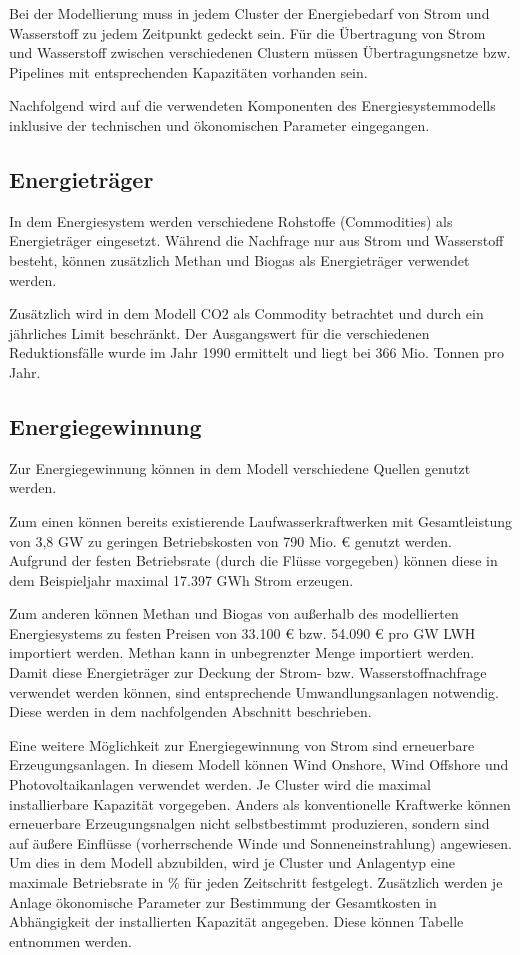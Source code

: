 Bei der Modellierung muss in jedem Cluster der Energiebedarf von Strom und Wasserstoff zu jedem Zeitpunkt gedeckt sein. Für die Übertragung von Strom und Wasserstoff zwischen verschiedenen Clustern müssen Übertragungsnetze bzw. Pipelines mit entsprechenden Kapazitäten vorhanden sein. 

Nachfolgend wird auf die verwendeten Komponenten des Energiesystemmodells inklusive der technischen und ökonomischen Parameter eingegangen. 
 
\subsection{Energieträger}
In dem Energiesystem werden verschiedene Rohstoffe (Commodities) als Energieträger eingesetzt. 
Während die Nachfrage nur aus Strom und Wasserstoff besteht, können zusätzlich Methan und Biogas als Energieträger verwendet werden.

Zusätzlich wird in dem Modell CO2 als Commodity betrachtet und durch ein jährliches Limit beschränkt. Der Ausgangswert für die verschiedenen Reduktionsfälle wurde im Jahr 1990 ermittelt und liegt bei 366 Mio. Tonnen pro Jahr. 

\subsection{Energiegewinnung}
Zur Energiegewinnung können in dem Modell verschiedene Quellen genutzt werden.

Zum einen können bereits existierende Laufwasserkraftwerken mit Gesamtleistung von 3,8 GW zu geringen Betriebskosten von 790 Mio. € genutzt werden. Aufgrund der festen Betriebsrate (durch die Flüsse vorgegeben) können diese in dem Beispieljahr maximal 17.397 GWh Strom erzeugen.

Zum anderen können Methan und Biogas von außerhalb des modellierten Energiesystems zu festen Preisen von 33.100 € bzw. 54.090 € pro GW LWH importiert werden. Methan kann in unbegrenzter Menge importiert werden.  
Damit diese Energieträger zur Deckung der Strom- bzw. Wasserstoffnachfrage verwendet werden können, sind entsprechende Umwandlungsanlagen notwendig. Diese werden in dem nachfolgenden Abschnitt beschrieben.

Eine weitere Möglichkeit zur Energiegewinnung von Strom sind erneuerbare Erzeugungsanlagen. In diesem Modell können Wind Onshore, Wind Offshore und Photovoltaikanlagen verwendet werden. Je Cluster wird die maximal installierbare Kapazität vorgegeben. 
Anders als konventionelle Kraftwerke können erneuerbare Erzeugungsnalgen nicht selbstbestimmt produzieren, sondern sind auf äußere Einflüsse (vorherrschende Winde und Sonneneinstrahlung) angewiesen. Um dies in dem Modell abzubilden, wird je Cluster und Anlagentyp eine maximale Betriebsrate in \% für jeden Zeitschritt festgelegt. Zusätzlich werden je Anlage ökonomische Parameter zur Bestimmung der Gesamtkosten in Abhängigkeit der installierten Kapazität angegeben. Diese können Tabelle  entnommen werden.


